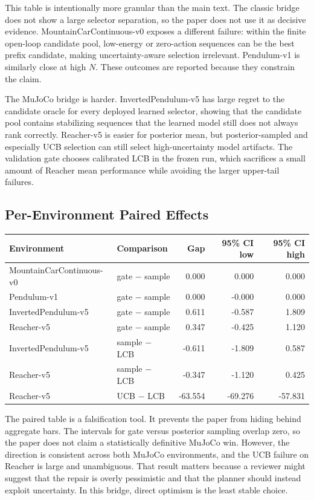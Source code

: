 \documentclass{article}
\begin{document}
This table is intentionally more granular than the main text. The classic
bridge does not show a large selector separation, so the paper does not use it
as decisive evidence. MountainCarContinuous-v0 exposes a different failure:
within the finite open-loop candidate pool, low-energy or zero-action
sequences can be the best prefix candidate, making uncertainty-aware selection
irrelevant. Pendulum-v1 is similarly close at high $N$. These outcomes are
reported because they constrain the claim.

The MuJoCo bridge is harder. InvertedPendulum-v5 has large regret to the
candidate oracle for every deployed learned selector, showing that the
candidate pool contains stabilizing sequences that the learned model still
does not always rank correctly. Reacher-v5 is easier for posterior mean, but
posterior-sampled and especially UCB selection can still select high-uncertainty
model artifacts. The validation gate chooses calibrated LCB in the frozen run,
which sacrifices a small amount of Reacher mean performance while avoiding the
larger upper-tail failures.

\subsection{Per-Environment Paired Effects}

\begin{center}
\small
\begin{tabular}{llrrr}
\toprule
Environment & Comparison & Gap & 95\% CI low & 95\% CI high \\
\midrule
MountainCarContinuous-v0 & gate $-$ sample & 0.000 & 0.000 & 0.000 \\
Pendulum-v1 & gate $-$ sample & 0.000 & -0.000 & 0.000 \\
InvertedPendulum-v5 & gate $-$ sample & 0.611 & -0.587 & 1.809 \\
Reacher-v5 & gate $-$ sample & 0.347 & -0.425 & 1.120 \\
InvertedPendulum-v5 & sample $-$ LCB & -0.611 & -1.809 & 0.587 \\
Reacher-v5 & sample $-$ LCB & -0.347 & -1.120 & 0.425 \\
Reacher-v5 & UCB $-$ LCB & -63.554 & -69.276 & -57.831 \\
\bottomrule
\end{tabular}
\end{center}

The paired table is a falsification tool. It prevents the paper from hiding
behind aggregate bars. The intervals for gate versus posterior sampling overlap
zero, so the paper does not claim a statistically definitive MuJoCo win.
However, the direction is consistent across both MuJoCo environments, and the
UCB failure on Reacher is large and unambiguous. That result matters because a
reviewer might suggest that the repair is overly pessimistic and that the
planner should instead exploit uncertainty. In this bridge, direct optimism is
the least stable choice.
\end{document}
